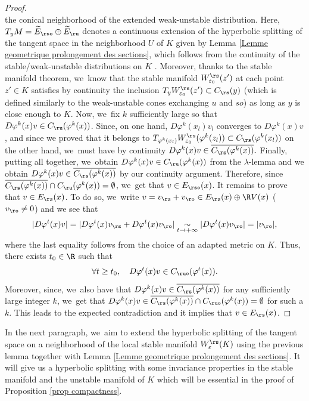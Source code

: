 \begin{proof}
\[\]
the conical neighborhood of the extended weak-unstable distribution. Here, $T_y M = \widetilde{E}_{\rso} \oplus \widetilde{E}_{\ru}$ denotes a continuous extension of the hyperbolic splitting of the tangent space in the neighborhood $U$ of $K$ given by Lemma \ref{Lemme geometrique prolongement des sections}, which follows from the continuity of the stable/weak-unstable distributions on $K$ \cite[Prop.\,5.1.4]{FH}. Moreover, thanks to the stable manifold theorem, we~know that the stable manifold $W_{\varepsilon_0}^\rs (z')$ at each point \hbox{$z' \in K$} satisfies by continuity the inclusion $ T_y W_{\varepsilon_0}^{\rs} (z') \subset C_{\rs} (y)$ (which is defined similarly to the weak-unstable cones exchanging $u$ and $so$) as long as $y$ is close enough to $K$. Now, we~fix $k$ sufficiently large so that $D \varphi^k (x)v \in C_{\ru} (\varphi^k (x))$. Since, on one hand, $D \varphi^k (x_l)v_l$ converges to $D \varphi^k (x)v$, and since we proved that it belongs to $ T_{\varphi^k (x_l)} W_{\varepsilon_0}^{\rs} (\varphi^k (z_l)) \subset C_{\rs} (\varphi^k (x_l))$ on the other hand, we~must have by continuity $ D \varphi^k (x)v \in \overline{C_{\rs} (\varphi^k (x))}.$
Finally, putting all together, we~obtain $D \varphi^k (x)v \in C_{\ru} (\varphi^k (x))$ from the $\lambda$-lemma and we obtain $ D \varphi^k (x)v \in \overline{C_{\rs} (\varphi^k (x))}$ by our continuity argument. Therefore, since $\overline{C_{\rs} (\varphi^k (x))} \cap C_{\ru} (\varphi^k (x)) = \emptyset$, we~get that $v \in E_{\rso} (x)$. It remains to prove that $v \in E_\rs (x)$. To do so, we~write $v = v_\rs + v_\ro \in E_\rs (x) \oplus \R V(x)$ ($v_\ro \neq 0$) and we see that
\[
|D\varphi^t (x) v| = |D\varphi^t (x) v_\rs + D\varphi^t (x) v_\ro| \underset{t \to +\infty}{\sim} |D\varphi^t (x) v_\ro | = |v_\ro|,
\]
where the last equality follows from the choice of an adapted metric on $K$. Thus, there exists $t_0 \in \R$ such that
\[
\forall t \geq t_0, \quad D\varphi^t (x) v \in C_{\ruo}(\varphi^t (x)).
\]
Moreover, since, we~also have that $ D \varphi^k (x)v \in \overline{C_{\rs} (\varphi^k (x))}$ for any sufficiently large integer $k$, we~get that $D \varphi^k (x)v \in \overline{C_{\rs} (\varphi^k (x))} \cap C_{\ruo}(\varphi^k (x)) = \emptyset$ for such a $k$. This leads to the expected contradiction and it implies that $v \in E_\rs (x)$.
\end{proof}
\Changelback%

In the next paragraph, we~aim to extend the hyperbolic splitting of the tangent space on a neighborhood of the local stable manifold $W_{\varepsilon}^\rs (K)$ using the previous lemma together with Lemma \ref{Lemme geometrique prolongement des sections}. It will give us a hyperbolic splitting with some invariance properties in the stable manifold and the unstable manifold of $K$ which will be essential in the proof of Proposition \ref{prop compactness}.

